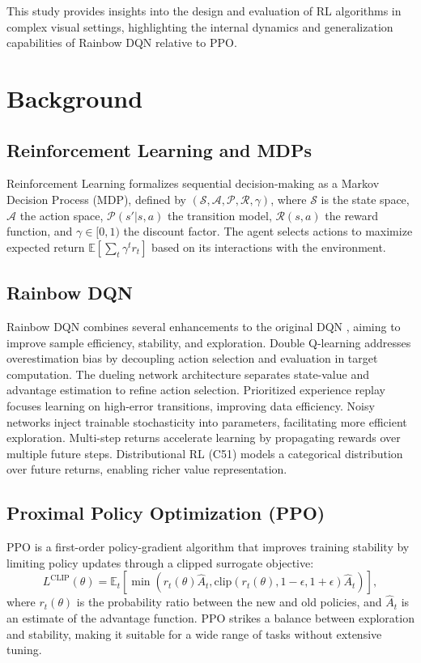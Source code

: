 \documentclass{article}
\begin{document}
This study provides insights into the design and evaluation of RL algorithms in complex visual settings, highlighting the internal dynamics and generalization capabilities of Rainbow DQN relative to PPO.

\section{Background}

\subsection{Reinforcement Learning and MDPs}

Reinforcement Learning formalizes sequential decision-making as a Markov Decision Process (MDP), defined by $(\mathcal{S}, \mathcal{A}, \mathcal{P}, \mathcal{R}, \gamma)$, where $\mathcal{S}$ is the state space, $\mathcal{A}$ the action space, $\mathcal{P}(s'|s,a)$ the transition model, $\mathcal{R}(s,a)$ the reward function, and $\gamma \in [0,1)$ the discount factor. The agent selects actions to maximize expected return $\mathbb{E}[\sum_t \gamma^t r_t]$ based on its interactions with the environment.

\subsection{Rainbow DQN}

Rainbow DQN \cite{hessel2018rainbow} combines several enhancements to the original DQN \cite{mnih2015human}, aiming to improve sample efficiency, stability, and exploration. Double Q-learning addresses overestimation bias by decoupling action selection and evaluation in target computation. The dueling network architecture separates state-value and advantage estimation to refine action selection. Prioritized experience replay focuses learning on high-error transitions, improving data efficiency. Noisy networks inject trainable stochasticity into parameters, facilitating more efficient exploration. Multi-step returns accelerate learning by propagating rewards over multiple future steps. Distributional RL (C51) models a categorical distribution over future returns, enabling richer value representation.

\subsection{Proximal Policy Optimization (PPO)}

PPO \cite{schulman2017proximal} is a first-order policy-gradient algorithm that improves training stability by limiting policy updates through a clipped surrogate objective:
\[
L^{\text{CLIP}}(\theta) = \mathbb{E}_t \left[ \min \left( r_t(\theta) \hat{A}_t, \text{clip}(r_t(\theta), 1 - \epsilon, 1 + \epsilon) \hat{A}_t \right) \right],
\]
where $r_t(\theta)$ is the probability ratio between the new and old policies, and $\hat{A}_t$ is an estimate of the advantage function. PPO strikes a balance between exploration and stability, making it suitable for a wide range of tasks without extensive tuning.
\end{document}
